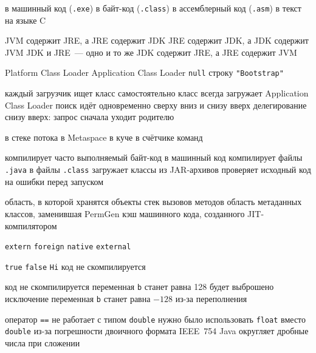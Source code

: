 \begin{enumerate}

  {в машинный код (\texttt{.exe})}
  {в байт-код (\texttt{.class})}
  {в ассемблерный код (\texttt{.asm})}
  {в текст на языке C}

  {JVM содержит JRE, а JRE содержит JDK}
  {JRE содержит JDK, а JDK содержит JVM}
  {JDK и JRE~--- одно и то же}
  {JDK содержит JRE, а JRE содержит JVM}

  {Platform Class Loader}
  {Application Class Loader}
  {\texttt{null}}
  {строку \texttt{"Bootstrap"}}

  {каждый загрузчик ищет класс самостоятельно}
  {класс всегда загружает Application Class Loader}
  {поиск идёт одновременно сверху вниз и снизу вверх}
  {делегирование снизу вверх: запрос сначала уходит родителю}

  {в стеке потока}
  {в Metaspace}
  {в куче}
  {в счётчике команд}

  {компилирует часто выполняемый байт-код в машинный код}
  {компилирует файлы \texttt{.java} в файлы \texttt{.class}}
  {загружает классы из JAR-архивов}
  {проверяет исходный код на ошибки перед запуском}

  {область, в которой хранятся объекты}
  {стек вызовов методов}
  {область метаданных классов, заменившая PermGen}
  {кэш машинного кода, созданного JIT-компилятором}

  {\texttt{extern}}
  {\texttt{foreign}}
  {\texttt{native}}
  {\texttt{external}}

  {\texttt{true}}
  {\texttt{false}}
  {\texttt{Hi}}
  {код не скомпилируется}

  {код не скомпилируется}
  {переменная \texttt{b} станет равна 128}
  {будет выброшено исключение}
  {переменная \texttt{b} станет равна $-128$ из-за переполнения}

  {оператор \texttt{==} не работает с типом \texttt{double}}
  {нужно было использовать \texttt{float} вместо \texttt{double}}
  {из-за погрешности двоичного формата IEEE~754}
  {Java округляет дробные числа при сложении}


\end{enumerate}

